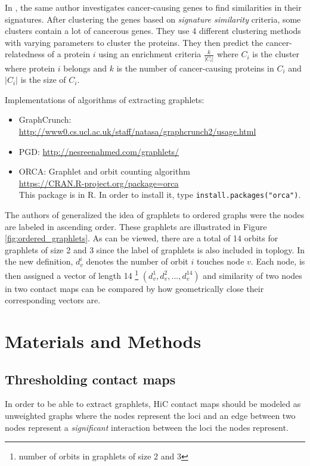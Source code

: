 \documentclass[a4,center,fleqn]{NAR}
\begin{document}
In \cite{milenkovic2010cancer}, the same author investigates 
cancer-causing genes to find similarities in their signatures. After
clustering the genes based on \textit{signature similarity} criteria,
some clusters contain a lot of cancerous genes.
They use 4 different clustering methods with varying parameters to cluster
the proteins. They then predict the cancer-relatedness of a protein 
$i$ using
an enrichment criteria $\frac{k}{|C_i|}$ where $C_i$ is the cluster
where protein $i$ belongs and $k$ is the number of cancer-causing
proteins in $C_i$ and $|C_i|$ is the size of $C_i$.

Implementations of algorithms of extracting graphlets: \\
\begin{itemize}
    \item GraphCrunch: 
        \url{http://www0.cs.ucl.ac.uk/staff/natasa/graphcrunch2/usage.html}
    \item PGD: \url{http://nesreenahmed.com/graphlets/}
    \item ORCA: Graphlet and orbit counting algorithm \\
        \url{ https://CRAN.R-project.org/package=orca} \\
        This package is in R. In order to install it, type
        \texttt{install.packages("orca")}.
        
\end{itemize}

The authors of \cite{di2010fast} generalized the idea of graphlets to 
ordered graphs were the nodes are labeled in ascending order.
These graphlets are illustrated in Figure \ref{fig:ordered_graphlets}.
As can be viewed, there are a total of 14 orbits for graphlets of size
2 and 3 since the label of graphlets is also included in toplogy.
In the new definition, $d_v^i$ denotes the number of orbit $i$ touches 
node $v$. Each node, is then assigned a vector of length 14 
\footnote{number of orbits in graphlets of size 2 and 3}
$(d_v^1, d_v^2, ..., d_v^{14})$ 
and similarity of two nodes in two contact maps can be compared by
how geometrically close their corresponding vectors are.
\section{Materials and Methods}
\subsection{Thresholding contact maps}
In order to be able to extract graphlets, HiC contact maps should be modeled as
unweighted graphs where the nodes represent the loci and an edge between two 
nodes represent a \textit{significant} interaction between the loci the nodes
represent.
\end{document}
